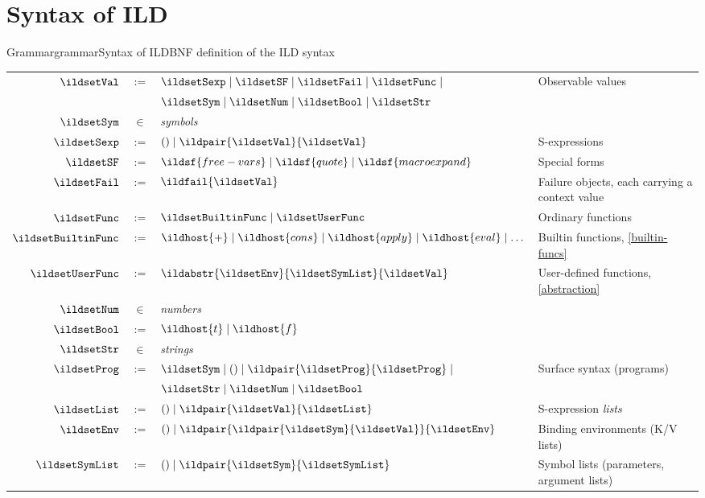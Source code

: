 \section{Syntax of ILD}
\label{syntax}
\begin{cfighere}{Grammar}{grammar}{Syntax of ILD}{BNF definition of the ILD syntax}\label{syntax-grammar}
{\footnotesize
\begin{tabular}{r@{\;}c@{\;}l@{\qquad}l}
\(\ildsetVal\) & \(:=\) & \(\ildsetSexp \mid \ildsetSF \mid \ildsetFail \mid \ildsetFunc \mid\) & Observable values \\
 & & \(\ildsetSym \mid \ildsetNum \mid \ildsetBool \mid \ildsetStr\) & \\
\(\ildsetSym\) & \(\in\) & \emph{symbols} & \\
\(\ildsetSexp\) & \(:=\) & \(() \mid \ildpair{\ildsetVal}{\ildsetVal}\) & S-expressions \\
\(\ildsetSF\) & \(:=\) & \(\ildsf{free-vars} \mid \ildsf{quote} \mid \ildsf{macroexpand}\) & Special forms \\
\(\ildsetFail\) & \(:=\) & \(\ildfail{\ildsetVal}\) & Failure objects, each carrying a context value \\
\(\ildsetFunc\) & \(:=\) & \(\ildsetBuiltinFunc \mid \ildsetUserFunc\) & Ordinary functions \\
\(\ildsetBuiltinFunc\) & \(:=\) & \(\ildhost{+} \mid \ildhost{cons} \mid \ildhost{apply} \mid \ildhost{eval} \mid \dots\) & Builtin functions, \cref{builtin-funcs} \\
\(\ildsetUserFunc\) & \(:=\) & \(\ildabstr{\ildsetEnv}{\ildsetSymList}{\ildsetVal}\) & User-defined functions, \cref{abstraction} \\
\(\ildsetNum\) & \(\in\) & \emph{numbers} & \\
\(\ildsetBool\) & \(:=\) & \(\ildhost{t} \mid \ildhost{f}\) & \\
\(\ildsetStr\) & \(\in\) & \emph{strings} & \\
\(\ildsetProg\) & \(:=\) & \(\ildsetSym \mid () \mid \ildpair{\ildsetProg}{\ildsetProg} \mid\) & Surface syntax (programs) \\
 & & \(\ildsetStr \mid \ildsetNum \mid \ildsetBool\) & \\
\(\ildsetList\) & \(:=\) & \(() \mid \ildpair{\ildsetVal}{\ildsetList}\) & S-expression \emph{lists} \\
\(\ildsetEnv\) & \(:=\) & \(() \mid \ildpair{\ildpair{\ildsetSym}{\ildsetVal}}{\ildsetEnv}\) & Binding environments (K/V lists) \\
\(\ildsetSymList\) & \(:=\) & \(() \mid \ildpair{\ildsetSym}{\ildsetSymList}\) & Symbol lists (parameters, argument lists) \\
\end{tabular}}
\end{cfighere}


